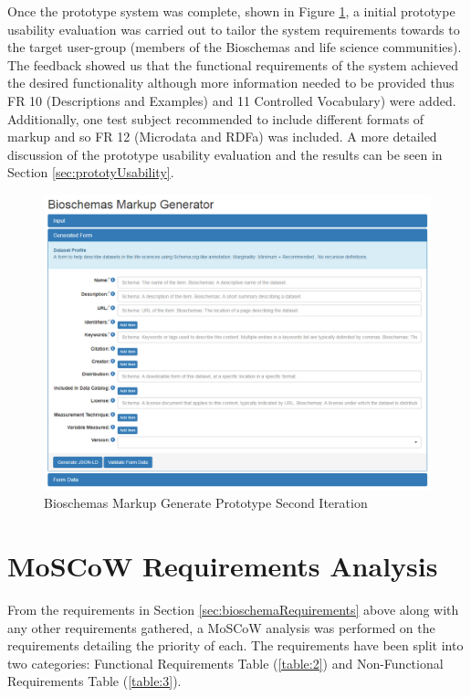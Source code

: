 Once the prototype system was complete, shown in Figure \ref{fig:bioProto}, a initial prototype usability evaluation was carried out to tailor the system requirements towards to the target user-group (members of the Bioschemas and life science communities). The feedback showed us that the functional requirements of the system achieved the desired functionality although more information needed to be provided thus FR 10 (Descriptions and Examples) and 11 Controlled Vocabulary) were added. Additionally, one test subject recommended to include different formats of markup and so FR 12 (Microdata and RDFa) was included. A more detailed discussion of the prototype usability evaluation and the results can be seen in Section \ref{sec:prototyUsability}.\newline

\begin{figure}[h]
 \centering\includegraphics[scale=0.5]{images/bioschemasPrototype.PNG}
   \caption{Bioschemas Markup Generate Prototype Second Iteration}
   \label{fig:bioProto}
\end{figure}

\newpage
\section{MoSCoW Requirements Analysis}
From the requirements in Section \ref{sec:bioschemaRequirements} above along with any other requirements gathered, a MoSCoW analysis was performed on the requirements detailing the priority of each. The requirements have been split into two categories: Functional Requirements Table (\ref{table:2}) and Non-Functional Requirements Table (\ref{table:3}).

